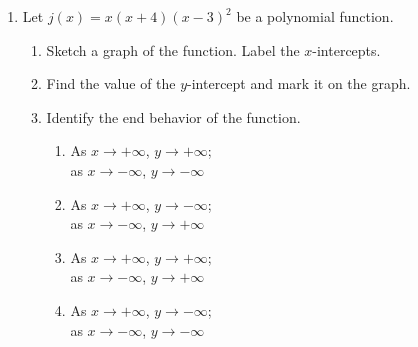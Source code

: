 \documentclass[12pt, twoside]{article}
\begin{document}
\begin{enumerate}[itemsep=0.5cm]
\newpage
\item Let $j(x)= x(x+4)(x-3)^2$ be a polynomial function. 
    \begin{center}
    \end{center}
    \begin{enumerate}[itemsep=0.25cm]
        \item Sketch a graph of the function. Label the $x$-intercepts.
        \item Find the value of the $y$-intercept and mark it on the graph. \vspace{1cm}
        \item Identify the end behavior of the function.
            \begin{multicols}{2}
            \begin{enumerate}
                \item As $x \to +\infty$, $y \to +\infty$; \\ 
                as $x \to -\infty$, $y \to -\infty$
                \item As $x \to +\infty$, $y \to -\infty$; \\
                as $x \to -\infty$, $y \to +\infty$
                \item As $x \to +\infty$, $y \to +\infty$; \\
                as $x \to -\infty$, $y \to +\infty$
                \item As $x \to +\infty$, $y \to -\infty$; \\
                as $x \to -\infty$, $y \to -\infty$        
            \end{enumerate}
            \end{multicols}
    \end{enumerate}
        

\end{enumerate}
\end{document}
